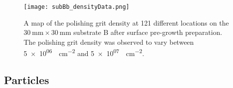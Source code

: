 \begin{figure}[htbp]
    \centering
    \texttt{[image: subBb\_densityData.png]}
    \caption[Map of the polishing grit density on substrate B after surface pre-growth preparation.]{A map of the polishing grit density at 121 different locations on the $\SI{30}{\milli\metre}\times\SI{30}{\milli\metre}$ substrate B after surface pre-growth preparation. The polishing grit density was observed to vary between \SI{5e+06}{\particle\centi\metre^{-2}} and \SI{5e+07}{\particle\centi\metre^{-2}}.}
    \label{fig:subBb_densityData}
\end{figure}

\subsection{Particles}
